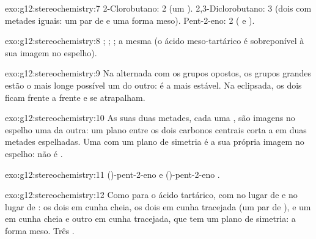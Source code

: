 \begin{solution}{exo:g12:stereochemistry:7}
2-Clorobutano: 2 (um ). 2,3-Diclorobutano: 3 (dois
 com metades iguais: um par de  e uma
forma meso). Pent-2-eno: 2 ( e ).
\end{solution}

\begin{solution}{exo:g12:stereochemistry:8}
; ; ; a mesma  (o
ácido meso-tartárico é sobreponível à sua imagem no espelho).
\end{solution}

\begin{solution}{exo:g12:stereochemistry:9}
Na  alternada com os grupos  opostos, os grupos
grandes estão o mais longe possível um do outro: é a mais estável. Na
eclipsada, os dois  ficam frente a frente e se atrapalham.
\end{solution}

\begin{solution}{exo:g12:stereochemistry:10}
As suas duas metades, cada uma , são imagens no espelho
uma da outra: um plano entre os dois carbonos centrais corta a 
em duas metades espelhadas. Uma  com um plano de simetria é a
sua própria imagem no espelho: não é .
\end{solution}

\begin{solution}{exo:g12:stereochemistry:11}
()-pent-2-eno 
e ()-pent-2-eno .
\end{solution}

\begin{solution}{exo:g12:stereochemistry:12}
Como para o ácido tartárico, com  no lugar de  e 
no lugar de : os dois  em cunha cheia, os dois em cunha
tracejada (um par de ), e um em cunha cheia e outro em cunha
tracejada, que tem um plano de simetria: a forma meso. Três
.
\end{solution}

